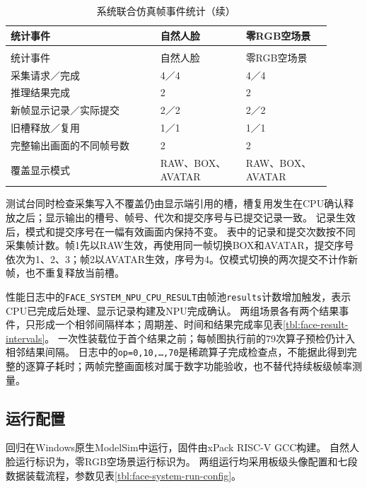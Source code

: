 \begin{reporttable}
\begin{longtable}{@{}p{0.42\linewidth}p{0.24\linewidth}p{0.24\linewidth}@{}}
\caption{系统联合仿真帧事件统计}\label{tbl:face-system-frame-counts}\\
\toprule
统计事件 & 自然人脸 & 零RGB空场景 \\
\midrule
\endfirsthead
\caption[]{系统联合仿真帧事件统计（续）}\\
\toprule
统计事件 & 自然人脸 & 零RGB空场景 \\
\midrule
\endhead
\bottomrule
\endfoot
采集请求／完成 & 4／4 & 4／4 \\
推理结果完成 & 2 & 2 \\
新帧显示记录／实际提交 & 2／2 & 2／2 \\
旧槽释放／复用 & 1／1 & 1／1 \\
完整输出画面的不同帧号数 & 2 & 2 \\
覆盖显示模式 & RAW、BOX、AVATAR & RAW、BOX、AVATAR \\
\end{longtable}
\end{reporttable}

测试台同时检查采集写入不覆盖仍由显示端引用的槽，槽复用发生在CPU确认释放之后；显示输出的槽号、帧号、代次和提交序号与已提交记录一致。
记录生效后，模式和提交序号在一幅有效画面内保持不变。
表中的记录和提交次数按不同采集帧计数。帧1先以RAW生效，再使用同一帧切换BOX和AVATAR，提交序号依次为1、2、3；帧2以AVATAR生效，序号为4。仅模式切换的两次提交不计作新帧，也不重复释放当前槽。

性能日志中的\texttt{FACE\_SYSTEM\_NPU\_CPU\_RESULT}由帧池\texttt{results}计数增加触发，表示CPU已完成后处理、显示记录构建及NPU完成确认。
两组场景各有两个结果事件，只形成一个相邻间隔样本；周期差、时间和结果完成率见表\ref{tbl:face-result-intervals}。
一次性装载位于首个结果之前；每帧图执行前的79次算子预检仍计入相邻结果间隔。
日志中的\texttt{op=0,10,\ldots,70}是稀疏算子完成检查点，不能据此得到完整的逐算子耗时；两帧完整画面核对属于数字功能验收，也不替代持续板级帧率测量。

\subsection{运行配置}

回归在Windows原生ModelSim中运行，固件由xPack RISC-V GCC构建。
自然人脸运行标识为，零RGB空场景运行标识为。
两组运行均采用板级头像配置和七段数据装载流程，参数见表\ref{tbl:face-system-run-config}。

